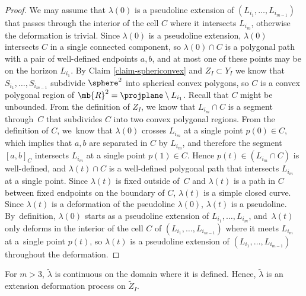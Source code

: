 \begin{proof}
We may assume that $\lambda(0)$ is a pseudoline extension of $(L_{i_1},\dots,L_{i_{m-1}})$ that passes through the interior of the cell $C$ where it intersects $L_{i_m}$, otherwise the deformation is trivial.
Since $\lambda(0)$ is a pseudoline extension, $\lambda(0)$ intersects $C$ in a single connected component, so $\lambda(0) \cap C$ is a polygonal path with a pair of well-defined endpoints $a,b$, and at most one of these points may be on the horizon $L_{i_1}$.
By Claim \ref{claim-sphericonvex} and $Z_I \subset Y_I$ we know that $S_{i_1},\dots,S_{i_{m-1}}$ subdivide $\sphere^2$ into spherical convex polygons, so $C$ is a convex polygonal region of $\mb{R}^2 = \projplane \setminus L_{i_1}$. Recall that $C$ might be unbounded.
From the definition of $Z_I$, we know that $L_{i_m} \cap C$ is a segment through~$C$ that subdivides $C$ into two convex polygonal regions.
From the definition of $C$, we~know that $\lambda(0)$ crosses $L_{i_m}$ at a single point $p(0) \in C$, which implies that $a,b$ are separated in $C$ by $L_{i_m}$, and therefore the segment $[a,b]_{C}$ intersects $L_{i_m}$ at a single point $p(1) \in C$.
Hence $p(t) \in (L_{i_m} \cap C)$ is well-defined, and $\lambda(t) \cap C$ is a well-defined polygonal path that intersects $L_{i_m}$ at a single point. Since $\lambda(t)$ is fixed outside of~$C$ and $\lambda(t)$ is a path in $C$ between fixed endpoints on the boundary of $C$, $\lambda(t)$ is a simple closed curve. Since $\lambda(t)$ is a deformation of the pseudoline $\lambda(0)$, $\lambda(t)$ is a pseudoline.
By~definition, $\lambda(0)$ starts as a pseudoline extension of $L_{i_1},\dots,L_{i_m}$, and~$\lambda(t)$ only deforms in the interior of the cell $C$ of $(L_{i_1},\dots,L_{i_{m-1}})$ where it meets $L_{i_m}$ at a~single point $p(t)$, so $\lambda(t)$ is a pseudoline extension of $(L_{i_1},\dots,L_{i_{m-1}})$ throughout the deformation.
\end{proof}

\begin{claim}\label{claim-lambda-continuous}
For $m >3$, $\tilde \lambda$ is continuous on the domain where it is defined. Hence, $\tilde \lambda$ is an extension deformation process on $\tilde Z_I$.
\end{claim}

